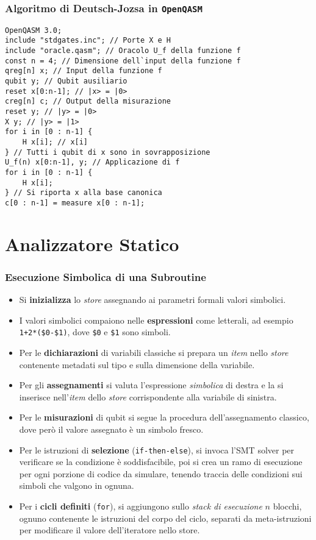 \documentclass{beamer}
\begin{document}
\begin{frame}[fragile]
\frametitle{Algoritmo di Deutsch-Jozsa in \texttt{OpenQASM}}
\begin{lstlisting}
OpenQASM 3.0;
include "stdgates.inc"; // Porte X e H
include "oracle.qasm"; // Oracolo U_f della funzione f
const n = 4; // Dimensione dell`input della funzione f
qreg[n] x; // Input della funzione f
qubit y; // Qubit ausiliario
reset x[0:n-1]; // |x> = |0>
creg[n] c; // Output della misurazione
reset y; // |y> = |0>
X y; // |y> = |1>
for i in [0 : n-1] {
    H x[i]; // x[i]
} // Tutti i qubit di x sono in sovrapposizione
U_f(n) x[0:n-1], y; // Applicazione di f
for i in [0 : n-1] {
    H x[i];
} // Si riporta x alla base canonica
c[0 : n-1] = measure x[0 : n-1];
\end{lstlisting}
\end{frame}

\section{Analizzatore Statico}

\begin{frame}
    \frametitle{Esecuzione Simbolica di una Subroutine}
    \begin{itemize}
        \itemsep 0em
        \item Si \textbf{inizializza} lo \emph{store} assegnando ai parametri formali valori simbolici.
        \item I valori simbolici compaiono nelle \textbf{espressioni} come letterali, ad esempio \texttt{1+2*(\$0-\$1)}, dove \texttt{\$0} e \texttt{\$1} sono simboli.
        \item Per le \textbf{dichiarazioni} di variabili classiche si prepara un \emph{item} nello \emph{store} contenente metadati sul tipo e sulla dimensione della variabile.
        \item Per gli \textbf{assegnamenti} si valuta l'espressione \emph{simbolica} di destra e la si inserisce nell'\emph{item} dello \emph{store} corrispondente alla variabile di sinistra.
        \item Per le \textbf{misurazioni} di qubit si segue la procedura dell'assegnamento classico, dove però il valore assegnato è un simbolo fresco.
        \item Per le istruzioni di \textbf{selezione} (\texttt{if-then-else}), si invoca l'SMT solver per verificare se la condizione è soddisfacibile, poi si crea un ramo di esecuzione per ogni porzione di codice da simulare, tenendo traccia delle condizioni sui simboli che valgono in ognuna.
        \item Per i \textbf{cicli definiti} (\texttt{for}), si aggiungono sullo \emph{stack di esecuzione} $n$ blocchi, ognuno contenente le istruzioni del corpo del ciclo, separati da meta-istruzioni per modificare il valore dell'iteratore nello store.
    \end{itemize}
\end{frame}
\end{document}
